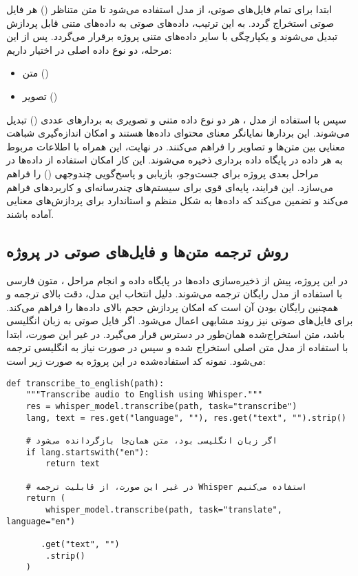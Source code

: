 \documentclass{article}
\begin{document}
ابتدا برای تمام فایل‌های صوتی، از مدل  استفاده می‌شود تا متن متناظر () هر فایل صوتی استخراج گردد.
به این ترتیب، داده‌های صوتی به داده‌های متنی قابل پردازش تبدیل می‌شوند و یکپارچگی با سایر داده‌های متنی پروژه برقرار می‌گردد.
پس از این مرحله، دو نوع داده اصلی در اختیار داریم:
\begin{itemize}
\item متن ()
\item تصویر ()
\end{itemize}

سپس با استفاده از مدل ، هر دو نوع داده متنی و تصویری به بردارهای عددی () تبدیل می‌شوند.
این بردارها نمایانگر معنای محتوای داده‌ها هستند و امکان اندازه‌گیری شباهت معنایی بین متن‌ها و تصاویر را فراهم می‌کنند.
در نهایت، این  همراه با اطلاعات مربوط به هر داده در پایگاه داده برداری  ذخیره می‌شوند.
این کار امکان استفاده از داده‌ها در مراحل بعدی پروژه برای جست‌وجو، بازیابی و پاسخ‌گویی چندوجهی () را فراهم می‌سازد.
این فرایند، پایه‌ای قوی برای سیستم‌های چندرسانه‌ای و کاربردهای  فراهم می‌کند و تضمین می‌کند که داده‌ها به شکل منظم و استاندارد برای پردازش‌های معنایی آماده باشند.

\subsection{روش ترجمه متن‌ها و فایل‌های صوتی در پروژه}
در این پروژه، پیش از ذخیره‌سازی داده‌ها در پایگاه داده و انجام مراحل ، متون فارسی با استفاده از مدل  رایگان  ترجمه می‌شوند.
دلیل انتخاب این مدل، دقت بالای ترجمه و همچنین رایگان بودن آن است که امکان پردازش حجم بالای داده‌ها را فراهم می‌کند.
برای فایل‌های صوتی نیز روند مشابهی اعمال می‌شود. اگر فایل صوتی به زبان انگلیسی باشد، متن استخراج‌شده همان‌طور در دسترس قرار می‌گیرد.
در غیر این صورت، ابتدا با استفاده از مدل  متن اصلی استخراج شده و سپس در صورت نیاز به انگلیسی ترجمه می‌شود.
نمونه کد استفاده‌شده در این پروژه به صورت زیر است:

\begin{latin}
\begin{lstlisting}
def transcribe_to_english(path):
    """Transcribe audio to English using Whisper."""
    res = whisper_model.transcribe(path, task="transcribe")
    lang, text = res.get("language", ""), res.get("text", "").strip()
    
    # اگر زبان انگلیسی بود، متن همان‌جا بازگردانده می‌شود
    if lang.startswith("en"):
        return text
    
    # در غیر این صورت، از قابلیت ترجمه Whisper استفاده می‌کنیم
    return (
        whisper_model.transcribe(path, task="translate", language="en")
 
       .get("text", "")
        .strip()
    )
\end{lstlisting}
\end{latin}
\end{document}
